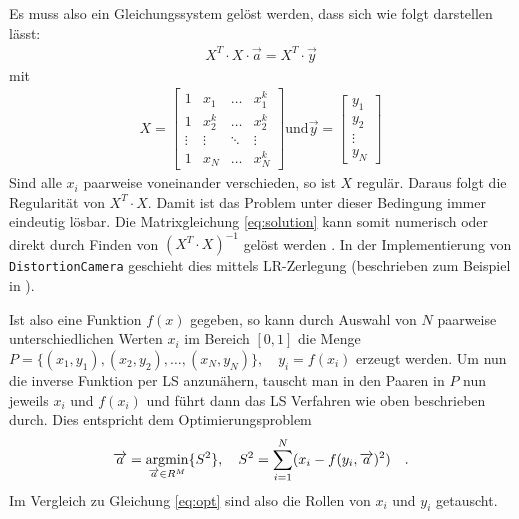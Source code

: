 Es muss also ein Gleichungssystem gelöst werden, dass sich wie folgt darstellen lässt:
\begin{gather}
X^T \cdot X \cdot \overrightarrow{a} = X^T \cdot
\overrightarrow{y} \label{eq:solution}
\end{gather}
mit 
\begin{gather}
X =
\begin{bmatrix}
1 & x_1 & \dots & x_1^k \\
1 & x_2^k & \dots & x_2^k \\
\vdots & \vdots & \ddots & \vdots \\
1 & x_N & \dots & x_N^k
\end{bmatrix}
\text{und} \overrightarrow{y} = \begin{bmatrix}
y_1 \\ y_2 \\ \vdots \\ y_N
\end{bmatrix}
\end{gather}
Sind alle $x_i$ paarweise voneinander verschieden, so ist $X$ regulär. Daraus folgt die Regularität von $X^T \cdot X$. Damit ist das Problem unter dieser Bedingung immer eindeutig lösbar. Die Matrixgleichung \ref{eq:solution} kann somit numerisch oder direkt durch Finden von $(X^T \cdot X)^{-1}$ gelöst werden \cite{lsq_poly_wolfram}. In der Implementierung von \texttt{DistortionCamera} geschieht dies mittels LR-Zerlegung (beschrieben zum Beispiel in \cite{bronstein}).

Ist also eine Funktion $f(x)$ gegeben, so kann durch Auswahl von $N$ paarweise unterschiedlichen Werten $x_i$ im Bereich $[0,1]$ die Menge $P = \{ (x_1, y_1), (x_2, y_2), \dots, (x_N, y_N) \}, \quad y_i = f(x_i)$ erzeugt werden. Um nun die inverse Funktion per LS anzunähern, tauscht man in den Paaren in $P$ nun jeweils $x_i$ und $f(x_i)$ und führt dann das LS Verfahren wie oben beschrieben durch. Dies entspricht dem Optimierungsproblem
\begin{equation}
\begin{split}
\overrightarrow{a} = \mathop{\mathrm{argmin}}_{\overrightarrow{a} \in R^M} \{ S^2 \}, \quad
S^2 =  \sum_{i=1}^{N} (x_i - f(y_i, \overrightarrow{a})^2)\quad.
\end{split}
\end{equation}
Im Vergleich zu Gleichung \ref{eq:opt} sind also die Rollen von $x_i$ und $y_i$ getauscht.